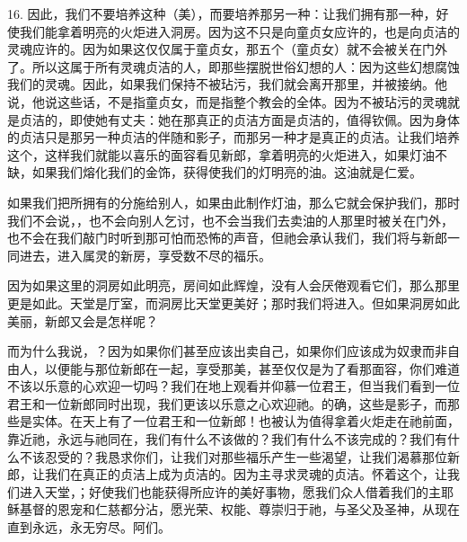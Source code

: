 16. 因此，我们不要培养这种（美），而要培养那另一种：让我们拥有那一种，好使我们能拿着明亮的火炬进入洞房。因为这不只是向童贞女应许的，也是向贞洁的灵魂应许的。因为如果这仅仅属于童贞女，那五个（童贞女）就不会被关在门外了。所以这属于所有灵魂贞洁的人，即那些摆脱世俗幻想的人：因为这些幻想腐蚀我们的灵魂。因此，如果我们保持不被玷污，我们就会离开那里，并被接纳。他说，他说这些话，不是指童贞女，而是指整个教会的全体。因为不被玷污的灵魂就是贞洁的，即使她有丈夫：她在那真正的贞洁方面是贞洁的，值得钦佩。因为身体的贞洁只是那另一种贞洁的伴随和影子，而那另一种才是真正的贞洁。让我们培养这个，这样我们就能以喜乐的面容看见新郎，拿着明亮的火炬进入，如果灯油不缺，如果我们熔化我们的金饰，获得使我们的灯明亮的油。这油就是仁爱。\par

如果我们把所拥有的分施给别人，如果由此制作灯油，那么它就会保护我们，那时我们不会说，，也不会向别人乞讨，也不会当我们去卖油的人那里时被关在门外，也不会在我们敲门时听到那可怕而恐怖的声音，但祂会承认我们，我们将与新郎一同进去，进入属灵的新房，享受数不尽的福乐。\par

因为如果这里的洞房如此明亮，房间如此辉煌，没有人会厌倦观看它们，那么那里更是如此。天堂是厅室，而洞房比天堂更美好；那时我们将进入。但如果洞房如此美丽，新郎又会是怎样呢？\par

而为什么我说，？因为如果你们甚至应该出卖自己，如果你们应该成为奴隶而非自由人，以便能与那位新郎在一起，享受那美，甚至仅仅是为了看那面容，你们难道不该以乐意的心欢迎一切吗？我们在地上观看并仰慕一位君王，但当我们看到一位君王和一位新郎同时出现，我们更该以乐意之心欢迎祂。的确，这些是影子，而那些是实体。在天上有了一位君王和一位新郎！也被认为值得拿着火炬走在祂前面，靠近祂，永远与祂同在，我们有什么不该做的？我们有什么不该完成的？我们有什么不该忍受的？我恳求你们，让我们对那些福乐产生一些渴望，让我们渴慕那位新郎，让我们在真正的贞洁上成为贞洁的。因为主寻求灵魂的贞洁。怀着这个，让我们进入天堂，；好使我们也能获得所应许的美好事物，愿我们众人借着我们的主耶稣基督的恩宠和仁慈都分沾，愿光荣、权能、尊崇归于祂，与圣父及圣神，从现在直到永远，永无穷尽。阿们。\par



